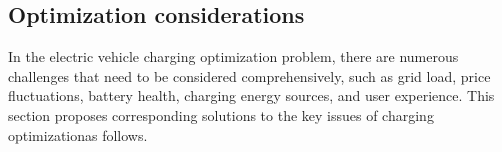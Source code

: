 \documentclass[
english,
ruledheaders=section,%
class=report,%
thesis={type=Report},%
accentcolor=9c,%
custommargins=true,%
marginpar=false,%
parskip=half-,%
fontsize=11pt,%
logofile={img/tuda_logo.pdf}, %
]{tudapub}
\begin{document}
    \subsection{Optimization considerations}
    \label{sbusec: Optimization considerations}


    In the electric vehicle charging optimization problem, there are numerous challenges that need to be considered comprehensively, such as grid load, price fluctuations, battery health, charging energy sources, and user experience. This section proposes corresponding solutions to the key issues of charging optimizationas follows.
\end{document}
